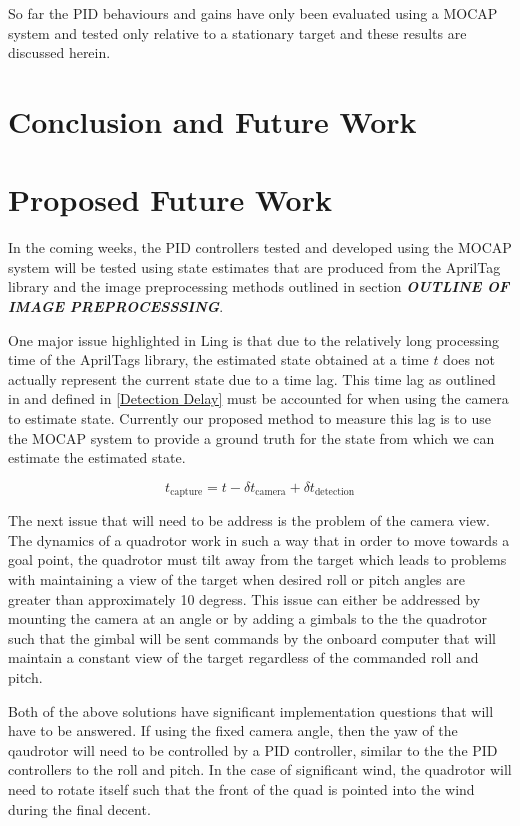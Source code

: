 \documentclass[11pt, twocolumn]{article}
\begin{document}
So far the PID behaviours and gains have only been evaluated using a MOCAP system and tested only relative to a stationary target and these results are discussed herein. 




\section{Conclusion and Future Work}


\section{Proposed Future Work}
In the coming weeks, the PID controllers tested and developed using the MOCAP system will be tested using state estimates that are produced from the AprilTag library and the image preprocessing methods outlined in section \textbf{\textit{OUTLINE OF IMAGE PREPROCESSSING}}. 

One major issue highlighted in Ling \cite{Ling2014} is that due to the relatively long processing time of the AprilTags library, the estimated state obtained at a time $t$ does not actually represent the current state due to a time lag. This time lag as outlined in \cite{Ling2014} and defined in \ref{Detection Delay} must be accounted for when using the camera to estimate state. Currently our proposed method to measure this lag is to use the MOCAP system to provide a ground truth for the state from which we can estimate the estimated state.  

\begin{equation}
\label{Detection Delay}
    t_{\text{capture}} = t - \delta t_{\text{camera}} + \delta t_{\text{detection}}
\end{equation}

The next issue that will need to be address is the problem of the camera view. The dynamics of a quadrotor work in such a way that in order to move towards a goal point, the quadrotor must tilt away from the target which leads to problems with maintaining a view of the target when desired roll or pitch angles are greater than approximately 10 degress. This issue can either be addressed by mounting the camera at an angle or by adding a gimbals to the the quadrotor such that the gimbal will be sent commands by the onboard computer that will maintain a constant view of the target regardless of the commanded roll and pitch. 

Both of the above solutions have significant implementation questions that will have to be answered. If using the fixed camera angle, then the yaw of the qaudrotor will need to be controlled by a PID controller, similar to the the PID controllers to the roll and pitch. In the case of significant wind, the quadrotor will need to rotate itself such that the front of the quad is pointed into the wind during the final decent.
\end{document}
